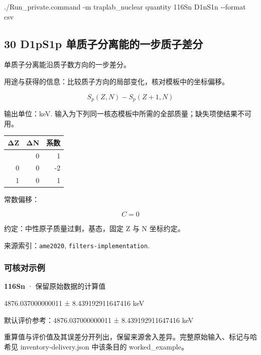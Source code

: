 \documentclass[
  11pt,
  letterpaper,
]{article}
\newenvironment{Shaded}{}{}
\newcommand{\AttributeTok}[1]{\textcolor[rgb]{0.49,0.56,0.16}{#1}}
\newcommand{\ExtensionTok}[1]{#1}
\newcommand{\NormalTok}[1]{#1}
\begin{document}
\begin{Shaded}
\begin{Highlighting}[]
\ExtensionTok{./Run\_private.command} \AttributeTok{{-}m}\NormalTok{ traplab\_nuclear quantity 116Sn D1nS1n }\AttributeTok{{-}{-}format}\NormalTok{ csv}
\end{Highlighting}
\end{Shaded}

\subsection{30 D1pS1p
单质子分离能的一步质子差分}\label{d1ps1p-ux5355ux8d28ux5b50ux5206ux79bbux80fdux7684ux4e00ux6b65ux8d28ux5b50ux5deeux5206}

单质子分离能沿质子数方向的一步差分。

用途与获得的信息：比较质子方向的局部变化，核对模板中的坐标偏移。

\[
S_p(Z,N)-S_p(Z+1,N)
\]

输出单位：keV.
输入为下列同一核态模板中所需的全部质量；缺失项使结果不可用。

\begin{longtable}[]{@{}rrr@{}}
\toprule\noalign{}
ΔZ & ΔN & 系数 \\
\midrule\noalign{}
\endhead
\bottomrule\noalign{}
\endlastfoot
-1 & 0 & 1 \\
0 & 0 & -2 \\
1 & 0 & 1 \\
\end{longtable}

常数偏移：

\[
C=0
\]

约定：中性原子质量过剩，基态，固定 Z 与 N 坐标约定。

来源索引：\texttt{ame2020}, \texttt{filters-implementation}.

\subsubsection{可核对示例}\label{ux53efux6838ux5bf9ux793aux4f8b-29}

\textbf{116Sn} · 保留原始数据的计算值

4876.037000000011 ± 8.439192911647416 keV

默认评价参考：4876.037000000011 ± 8.439192911647416 keV

重算值与评价值及其误差分开列出，保留来源舍入差异。完整原始输入、标记与哈希见
inventory-delivery.json 中该条目的 worked\_example。
\end{document}
